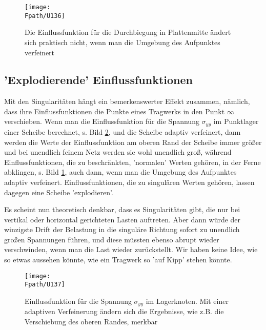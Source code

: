 {{{{{{{{{%
\begin{figure}
\centering
\texttt{[image: \\Fpath/U136]}
\caption{Die Einflussfunktion f\"{u}r die Durchbiegung in Plattenmitte \"{a}ndert sich praktisch nicht, wenn man die Umgebung des Aufpunktes verfeinert}
\label{U136}%
\end{figure}%

\textcolor{blau2}{\section{'Explodierende' Einflussfunktionen}}
Mit den Singularit\"{a}ten h\"{a}ngt ein bemerkenswerter Effekt zusammen, n\"{a}mlich, dass ihre Einflussfunktionen die Punkte eines Tragwerks in den Punkt $\infty$ verschieben. Wenn man die Einflussfunktion f\"{u}r die Spannung $\sigma_{yy}$ im Punktlager einer Scheibe berechnet, s. Bild \ref{U137}, und die Scheibe adaptiv verfeinert, dann werden die Werte der Einflussfunktion am oberen Rand der Scheibe immer gr\"{o}{\ss}er und bei unendlich feinem Netz werden sie wohl unendlich gro{\ss}, w\"{a}hrend Einflussfunktionen, die zu beschr\"{a}nkten, 'normalen' Werten geh\"{o}ren, in der Ferne abklingen, s. Bild \ref{U136}, auch dann, wenn man die Umgebung des Aufpunktes adaptiv verfeinert. Einflussfunktionen, die zu singul\"{a}ren Werten geh\"{o}ren, lassen dagegen eine Scheibe 'explodieren'.

Es scheint nun theoretisch denkbar, dass es Singularit\"{a}ten gibt, die nur bei vertikal oder horizontal gerichteten Lasten auftreten. Aber dann w\"{u}rde der winzigste Drift der Belastung in  die singul\"{a}re Richtung sofort zu unendlich gro{\ss}en Spannungen f\"{u}hren, und diese m\"{u}ssten ebenso abrupt wieder verschwinden, wenn man die Last wieder zur\"{u}ckstellt. Wir haben keine Idee, wie so etwas aussehen k\"{o}nnte, wie ein Tragwerk so 'auf Kipp' stehen k\"{o}nnte.


\begin{figure}
\centering
\texttt{[image: \\Fpath/U137]}
\caption{Einflussfunktion f\"{u}r die Spannung $\sigma_{yy}$ im Lagerknoten. Mit einer adaptiven Verfeinerung \"{a}ndern sich die Ergebnisse, wie z.B. die Verschiebung des oberen Randes, merkbar}
\label{U137}%
\end{figure}%


}}}}}}}}}
